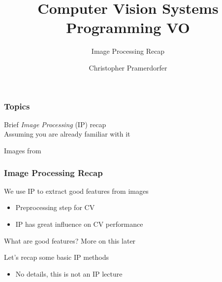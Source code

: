 \documentclass[xetex,professionalfont]{beamer}
\title{Computer Vision Systems Programming VO}
\subtitle{Image Processing Recap}
\author{Christopher Pramerdorfer}
\institute{Computer Vision Lab, Vienna University of Technology}
\begin{document}

\begin{frame}
\maketitle
\end{frame}


\begin{frame}
\frametitle{Topics}

Brief \emph{Image Processing} (IP) recap\\\medskip
Assuming you are already familiar with it

\bigskip
\begin{center}
    {\centering Images from \cite{prince12}}
\end{center}

\end{frame}


\begin{frame}
\frametitle{Image Processing Recap}

We use IP to extract good features from images
\begin{itemize}
    \item Preprocessing step for CV
    \item IP has great influence on CV performance
\end{itemize}

\bigskip
What are good features? More on this later

\bigskip
Let's recap some basic IP methods
\begin{itemize}
    \item No details, this is not an IP lecture
\end{itemize}

\end{frame}

\end{document}
